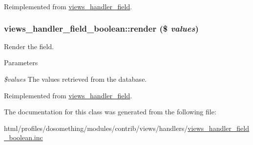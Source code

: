 Reimplemented from \hyperlink{classviews__handler__field_a0435d161922b7b4b84f02a2e79bb947a}{views\_\-handler\_\-field}.\hypertarget{classviews__handler__field__boolean_ad7d7fc1b29362cee6b2f043e029052af}{
\subsubsection[{render}]{\setlength{\rightskip}{0pt plus 5cm}views\_\-handler\_\-field\_\-boolean::render (\$ {\em values})}}
\label{classviews__handler__field__boolean_ad7d7fc1b29362cee6b2f043e029052af}
Render the field.


\begin{DoxyParams}{Parameters}
\item[{\em \$values}]The values retrieved from the database. \end{DoxyParams}


Reimplemented from \hyperlink{classviews__handler__field_a82ff951c5e9ceb97b2eab86f880cbc1e}{views\_\-handler\_\-field}.

The documentation for this class was generated from the following file:\begin{DoxyCompactItemize}
\item 
html/profiles/dosomething/modules/contrib/views/handlers/\hyperlink{views__handler__field__boolean_8inc}{views\_\-handler\_\-field\_\-boolean.inc}\end{DoxyCompactItemize}
